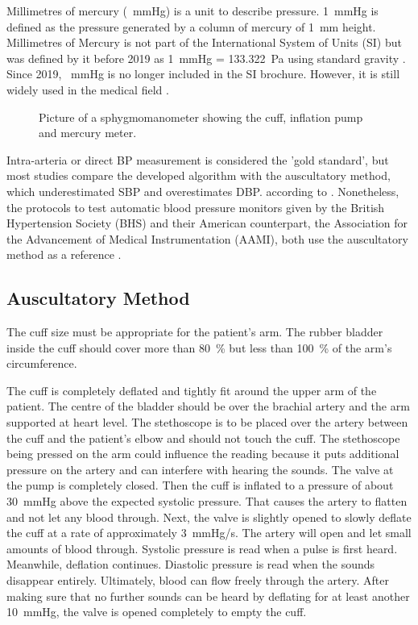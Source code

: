 Millimetres of mercury (\SI{}{\mmHg}) is a unit to describe pressure. \SI{1}{\mmHg} is defined as the pressure generated by a column of mercury of \SI{1}{\mm} height. Millimetres of Mercury is not part of the International System of Units (SI) but was defined by it before 2019 as \SI{1}{\mmHg} = \SI{133.322}{\Pa} using standard gravity \citep{SI2006}. Since 2019, \SI{}{\mmHg} is no longer included in the SI brochure. However, it is still widely used in the medical field \citep{Prazak2020}.

\begin{figure}[h]
\centering
\caption{Picture of a sphygmomanometer showing the cuff, inflation pump and mercury meter.}
\label{fig:sphy}
\end{figure}

Intra-arteria or direct BP measurement is considered the 'gold standard', but most studies compare the developed algorithm with the auscultatory method, which underestimated SBP and overestimates DBP. according to \citet{Sapinski1996}. Nonetheless, the protocols to test automatic blood pressure monitors given by the British Hypertension Society (BHS) and their American counterpart, the Association for the Advancement of Medical Instrumentation (AAMI), both use the auscultatory method as a reference \citep{Jazbinsek2010,OBrien1993,AAMI2013}.

\subsection{Auscultatory Method}
The cuff size must be appropriate for the patient's arm. The rubber bladder inside the cuff should cover more than \SI{80}{\%} but less than \SI{100}{\%} of the arm's circumference.

The cuff is completely deflated and tightly fit around the upper arm of the patient. The centre of the bladder should be over the brachial artery and the arm supported at heart level. The stethoscope is to be placed over the artery between the cuff and the patient's elbow and should not touch the cuff. The stethoscope being pressed on the arm could influence the reading because it puts additional pressure on the artery and can interfere with hearing the sounds.
The valve at the pump is completely closed. Then the cuff is inflated to a pressure of about \SI{30}{\mmHg} above the expected systolic pressure. That causes the artery to flatten and not let any blood through. Next, the valve is slightly opened to slowly deflate the cuff at a rate of approximately \SI{3}{\mmHg/\second}. The artery will open and let small amounts of blood through. Systolic pressure is read when a pulse is first heard. Meanwhile, deflation continues. Diastolic pressure is read when the sounds disappear entirely. Ultimately, blood can flow freely through the artery. After making sure that no further sounds can be heard by deflating for at least another \SI{10}{\mmHg}, the valve is opened completely to empty the cuff. \citep{Lloyd2018, Reeves1995}


